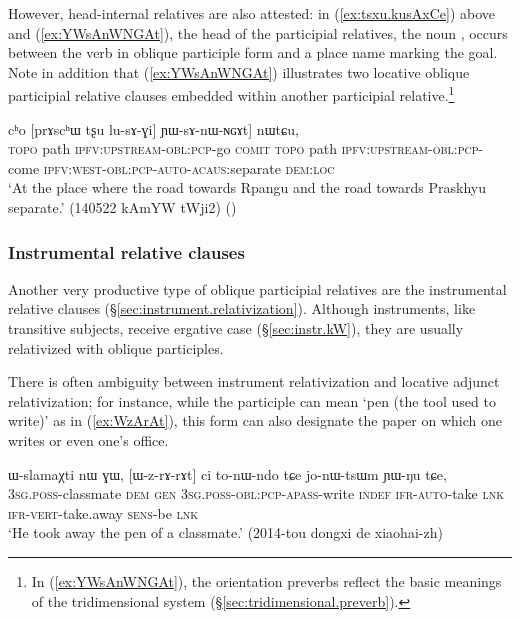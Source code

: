 However, head-internal relatives are also attested: in (\ref{ex:tsxu.kusAxCe}) above and (\ref{ex:YWsAnWNGAt}), the head of the participial relatives, the noun , occurs between the verb in oblique participle form and a place name marking the goal. Note in addition that (\ref{ex:YWsAnWNGAt}) illustrates two locative oblique participial relative clauses embedded within another participial relative.\footnote{In (\ref{ex:YWsAnWNGAt}), the orientation preverbs reflect the basic meanings of the tridimensional system (§\ref{sec:tridimensional.preverb}). 
}

\begin{exe}
\ex \label{ex:YWsAnWNGAt}
\gll   [[rpɤŋgɯ tʂu lu-sɤx-ɕe] cʰo [prɤscʰɯ tʂu lu-sɤ-ɣi] ɲɯ-sɤ-nɯ-ɴɢɤt] nɯtɕu, \\
\textsc{topo}  path \textsc{ipfv}:\textsc{upstream}-\textsc{obl}:\textsc{pcp}-go \textsc{comit}  \textsc{topo}  path \textsc{ipfv}:\textsc{upstream}-\textsc{obl}:\textsc{pcp}-come \textsc{ipfv}:\textsc{west}-\textsc{obl}:\textsc{pcp}-\textsc{auto}-\textsc{acaus}:separate \textsc{dem}:\textsc{loc} \\
\glt `At the place where the road towards Rpangu and the road towards Praskhyu separate.' (140522 kAmYW tWji2)
()
\end{exe}

\subsubsection{Instrumental relative clauses} \label{sec:instrumental.participle.relatives}
Another very productive type of oblique participial relatives are the instrumental relative clauses (§\ref{sec:instrument.relativization}). Although instruments, like transitive subjects, receive ergative case (§\ref{sec:instr.kW}), they are usually relativized with oblique participles.

There is often ambiguity between instrument relativization and locative adjunct relativization; for instance, while the participle  can mean `pen (the tool used to write)' as in (\ref{ex:WzArAt}), this form can also designate the paper on which one writes or even one's office.

\begin{exe}
\ex \label{ex:WzArAt}
\gll ɯ-slamaχti nɯ ɣɯ, [ɯ-z-rɤ-rɤt] ci to-nɯ-ndo tɕe jo-nɯ-tsɯm ɲɯ-ŋu tɕe, \\
\textsc{3sg}.\textsc{poss}-classmate \textsc{dem} \textsc{gen} \textsc{3sg}.\textsc{poss}-\textsc{obl}:\textsc{pcp}-\textsc{apass}-write \textsc{indef} \textsc{ifr}-\textsc{auto}-take \textsc{lnk} \textsc{ifr}-\textsc{vert}-take.away \textsc{sens}-be \textsc{lnk} \\
\glt `He took away the pen of a classmate.' (2014-tou dongxi de xiaohai-zh)
\end{exe}

